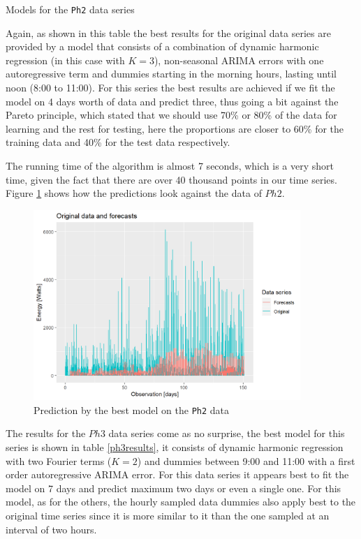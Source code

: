 \documentclass[12pt,a4paper,titlepage]{report}
\begin{document}
\begin{table}[htbp]
    \centering
    \caption{Models for the \texttt{Ph2} data series}
    \label{ph2results}
\end{table}

Again, as shown in this table the best results for the original data series are provided by a model that consists of a combination of dynamic harmonic regression (in this case with $ K = 3 $), non-seasonal ARIMA errors with one autoregressive term and dummies starting in the morning hours, lasting until noon (8:00 to 11:00). For this series the best results are achieved if we fit the model on 4 days worth of data and predict three, thus going a bit against the Pareto principle, which stated that we should use 70\% or 80\% of the data for learning and the rest for testing, here the proportions are closer to 60\% for the training data and 40\% for the test data respectively.

The running time of the algorithm is almost 7 seconds, which is a very short time, given the fact that there are over 40 thousand points in our time series. Figure \ref{dbestph2} shows how the predictions look against the data of $ Ph2 $.

\begin{figure}[htbp]
    \centering
    \includegraphics[width=0.9\textwidth]{dbestph2}
    \caption{Prediction by the best model on the \texttt{Ph2} data}
    \label{dbestph2}
\end{figure}

The results for the $ Ph3 $ data series come as no surprise, the best model for this series is shown in table \ref{ph3results}, it consists of dynamic harmonic regression with two Fourier terms ($ K = 2 $) and dummies between 9:00 and 11:00 with a first order autoregressive ARIMA error.
For this data series it appears best to fit the model on 7 days and predict maximum two days or even a single one. For this model, as for the others, the hourly sampled data dummies also apply best to the original time series since it is more similar to it than the one sampled at an interval of two hours.
\end{document}
